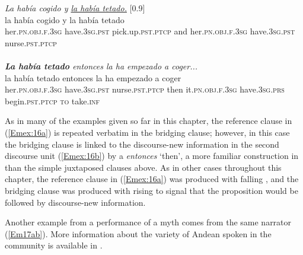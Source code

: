 \documentclass[output=paper]{LSP/langsci}
\begin{document}
\begin{exe}
\ex \label{Em16ab}
\begin{xlist}
\ex \label{Emex:16a}
\glt \textit{La había cogido y  \underline{la había tetado.}} [0.9]\\
\gll la había cogido y la había tetado\\
 her\textsc{.pn.obj.f.3sg} have\textsc{.3sg.pst} pick.up\textsc{.pst.ptcp} and her\textsc{.pn.obj.f.3sg} have\textsc{.3sg.pst} nurse\textsc{.pst.ptcp}\\
\glt {}\\
\ex \label{Emex:16b}
\glt \textit{\textbf{La había tetado} entonces la ha empezado a coger...}\\
\gll la había tetado entonces la ha empezado a coger\\     	      
    her\textsc{.pn.obj.f.3sg} have\textsc{.3sg.pst} nurse\textsc{.pst.ptcp} then it\textsc{.pn.obj.f.3sg} have\textsc{.3sg.prs} begin\textsc{.pst.ptcp} \textsc{to} take\textsc{.inf}\\
\glt {}
\end{xlist}
\end{exe}


%
As in many of the examples given so far in this chapter, the reference clause in (\ref{Emex:16a}) is repeated verbatim in the bridging clause; however, in this case the bridging clause is linked to the discourse-new information in the second discourse unit (\ref{Emex:16b}) by a  \textit{entonces} `then', a more familiar construction in  than the simple juxtaposed clauses above. As in other cases throughout this chapter, the reference clause in (\ref{Emex:16a}) was produced with falling , and the bridging clause was produced with rising  to signal that the proposition would be followed by discourse-new information.


Another example from a  performance of a  myth comes from the same narrator (\ref{Em17ab}). More information about the variety of Andean  spoken in the community is available in \citet{emlenforth}.
%
\end{document}
